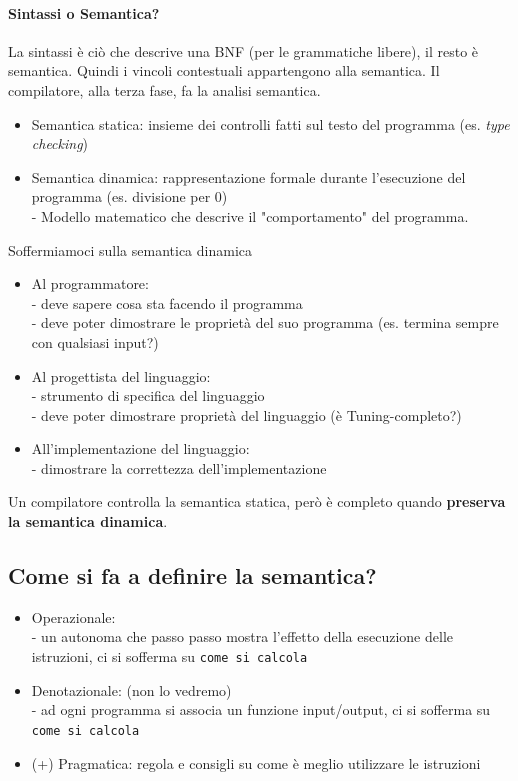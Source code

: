 \documentclass[a4paper,12pt]{article}
\begin{document}
\paragraph*{Sintassi o Semantica?\\}
La sintassi è ciò che descrive una BNF (per le grammatiche libere), il resto è semantica. Quindi i vincoli contestuali appartengono alla semantica. Il compilatore, alla terza fase, fa la analisi semantica. \\
\begin{itemize}
  \item Semantica statica: insieme dei controlli fatti sul testo del programma (es. \textit{type checking})
  \item Semantica dinamica: rappresentazione formale durante l'esecuzione del programma (es. divisione per 0) \\
  - Modello matematico che descrive il "comportamento" del programma.
\end{itemize}
Soffermiamoci sulla semantica dinamica
\begin{itemize}
  \item Al programmatore: \\
  - deve sapere cosa sta facendo il programma   \\
  - deve poter dimostrare le proprietà del suo programma (es. termina sempre con qualsiasi input?)
  \item Al progettista del linguaggio: \\
  - strumento di specifica del linguaggio \\ 
  - deve poter dimostrare proprietà del linguaggio (è Tuning-completo?)
  \item All'implementazione del linguaggio: \\
  - dimostrare la correttezza dell'implementazione
\end{itemize}
Un compilatore controlla la semantica statica, però è completo quando \textbf{preserva la semantica dinamica}. \\
\subsection{Come si fa a definire la semantica?}
\begin{itemize}
  \item Operazionale: \\
  - un autonoma che passo passo mostra l'effetto della esecuzione delle istruzioni, ci si sofferma su \texttt{come si calcola}
  \item Denotazionale: (non lo vedremo)\\
  - ad ogni programma si associa un funzione input/output, ci si sofferma su \texttt{come si calcola} 
  \item (+) Pragmatica: regola e consigli su come è meglio utilizzare le istruzioni
\end{itemize}
\end{document}
